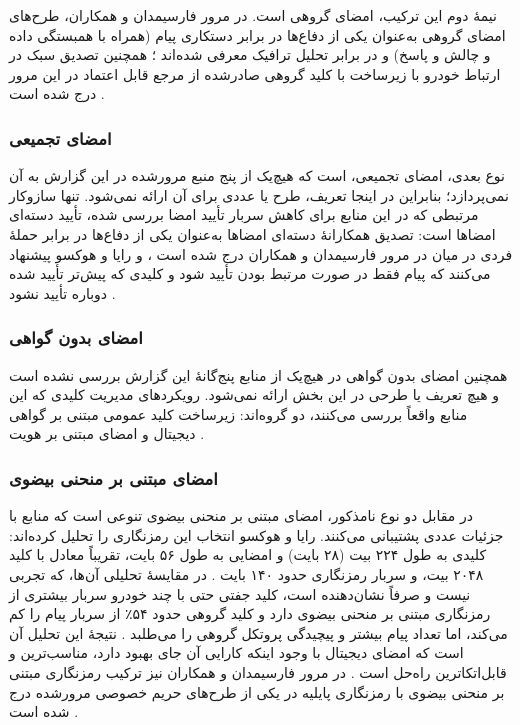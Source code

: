 \documentclass[12pt,a4paper]{article}
\begin{document}
نیمهٔ دوم این ترکیب، امضای گروهی است. در مرور فارسیمدان و همکاران، طرح‌های امضای گروهی به‌عنوان یکی از دفاع‌ها در برابر دستکاری پیام (همراه با همبستگی داده و چالش و پاسخ) و در برابر تحلیل ترافیک معرفی شده‌اند \cite{farsimadanReviewSecurityChallenges2025}؛ همچنین تصدیق سبک در ارتباط خودرو با زیرساخت با کلید گروهی صادرشده از مرجع قابل اعتماد در این مرور درج شده است \cite{farsimadanReviewSecurityChallenges2025}.

\subsubsection{امضای تجمیعی}

نوع بعدی، امضای تجمیعی، است که هیچ‌یک از پنج منبع مرورشده در این گزارش به آن نمی‌پردازد؛ بنابراین در اینجا تعریف، طرح یا عددی برای آن ارائه نمی‌شود. تنها سازوکار مرتبطی که در این منابع برای کاهش سربار تأیید امضا بررسی شده، تأیید دسته‌ای امضا‌ها است: تصدیق همکارانهٔ دسته‌ای امضا‌ها به‌عنوان یکی از دفاع‌ها در برابر حملهٔ فردی در میان در مرور فارسیمدان و همکاران درج شده است \cite{farsimadanReviewSecurityChallenges2025}، و رایا و هوکسو پیشنهاد می‌کنند که پیام فقط در صورت مرتبط بودن تأیید شود و کلیدی که پیش‌تر تأیید شده دوباره تأیید نشود \cite{SecuringVehicularAd}.

\subsubsection{امضای بدون گواهی}

همچنین امضای بدون گواهی در هیچ‌یک از منابع پنج‌گانهٔ این گزارش بررسی نشده است و هیچ تعریف یا طرحی در این بخش ارائه نمی‌شود. رویکرد‌های مدیریت کلیدی که این منابع واقعاً بررسی می‌کنند، دو گروه‌اند: زیرساخت کلید عمومی مبتنی بر گواهی دیجیتال \cite{SecuringVehicularAd} و امضای مبتنی بر هویت \cite{linGSISSecurePrivacyPreserving2007}.

\subsubsection{امضای مبتنی بر منحنی بیضوی}

در مقابل دو نوع نامذکور، امضای مبتنی بر منحنی بیضوی تنوعی است که منابع با جزئیات عددی پشتیبانی می‌کنند. رایا و هوکسو انتخاب این رمزنگاری را تحلیل کرده‌اند: کلیدی به طول ۲۲۴ بیت (۲۸ بایت) و امضایی به طول ۵۶ بایت، تقریباً معادل  با کلید ۲۰۴۸ بیت، و سربار رمزنگاری حدود ۱۴۰ بایت \cite{SecuringVehicularAd}. در مقایسهٔ تحلیلی آن‌ها، که تجربی نیست و صرفاً نشان‌دهنده است، کلید جفتی حتی با چند خودرو سربار بیشتری از رمزنگاری مبتنی بر منحنی بیضوی دارد و کلید گروهی حدود ۵۴٪ از سربار پیام را کم می‌کند، اما تعداد پیام بیشتر و پیچیدگی پروتکل گروهی را می‌طلبد \cite{SecuringVehicularAd}. نتیجهٔ این تحلیل آن است که امضای دیجیتال با وجود اینکه کارایی آن جای بهبود دارد، مناسب‌ترین و قابل‌اتکاترین راه‌حل است \cite{SecuringVehicularAd}. در مرور فارسیمدان و همکاران نیز ترکیب رمزنگاری مبتنی بر منحنی بیضوی با رمزنگاری پایلیه در یکی از طرح‌های حریم خصوصی مرورشده درج شده است \cite{farsimadanReviewSecurityChallenges2025}.
\end{document}
